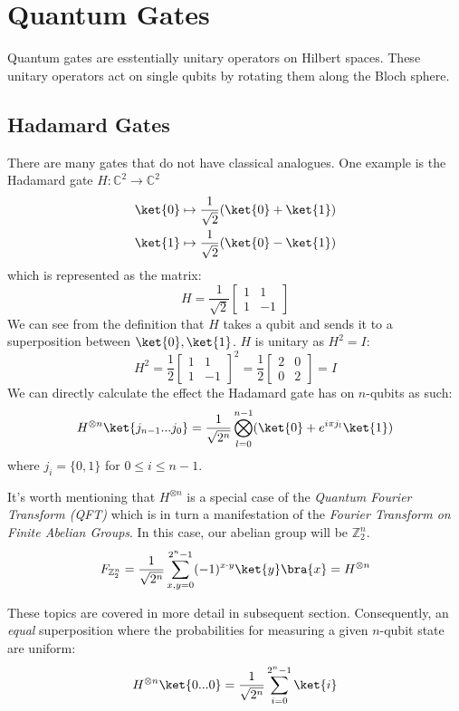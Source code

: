 \section{Quantum Gates}

Quantum gates are esstentially unitary operators on Hilbert spaces. These unitary operators act on single qubits by rotating them along the Bloch sphere.

\subsection{Hadamard Gates}
There are many gates that do not have classical analogues. One example is the Hadamard gate $H: \mathbb{C}^2 \rightarrow \mathbb{C}^2$
\begin{gather*}
  \ket{0} \mapsto \frac{1}{\sqrt{2}}(\ket{0} + \ket{1}) \\
  \ket{1} \mapsto \frac{1}{\sqrt{2}}(\ket{0} - \ket{1})
\end{gather*}
which is represented as the matrix:
$$ H =  \frac{1}{\sqrt{2}} \begin{bmatrix} 1 & 1 \\ 1 & -1 \end{bmatrix} $$
We can see from the definition that $H$ takes a qubit and sends it to a superposition between $\ket{0},\ket{1}$. $H$ is unitary as $H^2 = I$:
$$H^2 = \frac{1}{2} \begin{bmatrix} 1 & 1 \\ 1 & -1 \end{bmatrix}^2 = \frac{1}{2}\begin{bmatrix} 2 & 0 \\ 0 & 2 \end{bmatrix} = I $$
%
We can directly calculate the effect the Hadamard gate has on $n$-qubits as such:
%
$$ H^{\otimes n} \ket{j_{n-1}...j_0} = \frac{1}{\sqrt{2^n}}\bigotimes_{l=0}^{n-1} (\ket{0} + e^{i\pi j_l}\ket{1}) $$
%
where $j_i = \{0,1\}$ for $0 \leq i \leq n-1$.

It's worth mentioning that $H^{\otimes n}$ is a special case of the \textit{Quantum Fourier Transform (QFT)} which is in turn a manifestation of the \textit{Fourier Transform on Finite Abelian Groups}. In this case, our abelian group will be $\mathbb{Z}_2^n$.
%
\begin{equation}
  F_{\mathbb{Z}_2^n} = \frac{1}{\sqrt{2^n}} \sum_{x,y=0}^{2^n-1} (-1)^{x \cdot y} \ket{y}\bra{x} = H^{\otimes n}
\end{equation}

These topics are covered in more detail in subsequent section.
%
Consequently, an \textit{equal} superposition where the probabilities for measuring a given $n$-qubit state are uniform:
$$H^{\otimes n}\ket{0...0} = \frac{1}{\sqrt{2^n}}\sum_{i=0}^{2^n-1}\ket{i}$$


